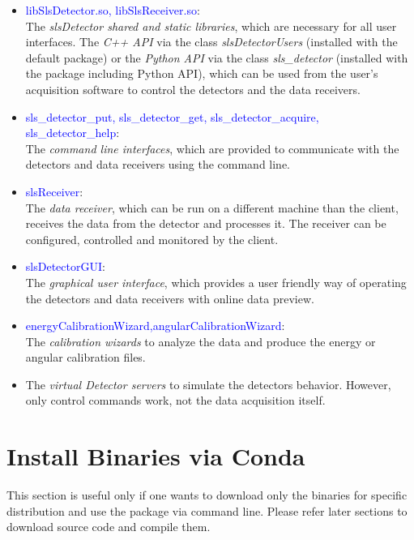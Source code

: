 \documentclass{article}
\begin{document}
\begin{itemize}

\item \textcolor{blue}{libSlsDetector.so, libSlsReceiver.so}:\\
The \textit{slsDetector shared and static libraries}, which are
necessary for all user interfaces. The \textit{C++ API} via the class
\textit{slsDetectorUsers} (installed with the default package) or the
\textit{Python API} via the class \textit{sls\_detector} (installed with the
package including Python API), which can be used from the user's acquisition
software to control the detectors and the data receivers.

\item \textcolor{blue}{sls\_detector\_put, sls\_detector\_get,
sls\_detector\_acquire, sls\_detector\_help}: \\
The \textit{command line interfaces}, which are provided to communicate with the
detectors and data receivers using the command line.

\item \textcolor{blue}{slsReceiver}: \\
The \textit{data receiver}, which can be run on a different machine than the
client, receives the data from the detector and processes it. The receiver can
be configured, controlled and monitored by the client.

\item \textcolor{blue}{slsDetectorGUI}: \\
The \textit{graphical user interface}, which provides a user friendly way
of operating the detectors and data receivers with online data preview.

\item \textcolor{blue}{energyCalibrationWizard,angularCalibrationWizard}: \\
The \textit{calibration wizards} to analyze the data and produce the energy or
angular calibration files.

\item The \textit{virtual Detector servers} to simulate the detectors behavior.
However, only control commands work, not the data acquisition itself.
\end{itemize}




\section{Install Binaries via Conda}
This section is useful only if one wants to download only the binaries for
specific distribution and use the package via command line. Please refer later
sections to download source code and compile them.\bigskip
\end{document}
